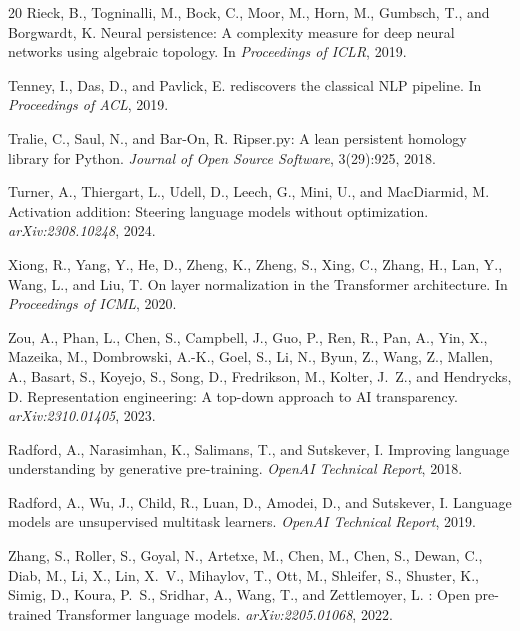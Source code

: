 \documentclass[11pt,a4paper]{article}
\begin{document}
\begin{thebibliography}{20}
Rieck, B., Togninalli, M., Bock, C., Moor, M., Horn, M., Gumbsch, T., and Borgwardt, K.
\newblock Neural persistence: A complexity measure for deep neural networks using algebraic topology.
\newblock In \emph{Proceedings of ICLR}, 2019.

Tenney, I., Das, D., and Pavlick, E.
 rediscovers the classical {NLP} pipeline.
\newblock In \emph{Proceedings of ACL}, 2019.

Tralie, C., Saul, N., and Bar-On, R.
\newblock Ripser.py: A lean persistent homology library for {P}ython.
\newblock \emph{Journal of Open Source Software}, 3(29):925, 2018.

Turner, A., Thiergart, L., Udell, D., Leech, G., Mini, U., and MacDiarmid, M.
\newblock Activation addition: Steering language models without optimization.
\newblock \emph{arXiv:2308.10248}, 2024.

Xiong, R., Yang, Y., He, D., Zheng, K., Zheng, S., Xing, C., Zhang, H., Lan, Y., Wang, L., and Liu, T.
\newblock On layer normalization in the {T}ransformer architecture.
\newblock In \emph{Proceedings of ICML}, 2020.

Zou, A., Phan, L., Chen, S., Campbell, J., Guo, P., Ren, R., Pan, A., Yin, X., Mazeika, M., Dombrowski, A.-K., Goel, S., Li, N., Byun, Z., Wang, Z., Mallen, A., Basart, S., Koyejo, S., Song, D., Fredrikson, M., Kolter, J.~Z., and Hendrycks, D.
\newblock Representation engineering: A top-down approach to {AI} transparency.
\newblock \emph{arXiv:2310.01405}, 2023.


Radford, A., Narasimhan, K., Salimans, T., and Sutskever, I.
\newblock Improving language understanding by generative pre-training.
\newblock \emph{OpenAI Technical Report}, 2018.

Radford, A., Wu, J., Child, R., Luan, D., Amodei, D., and Sutskever, I.
\newblock Language models are unsupervised multitask learners.
\newblock \emph{OpenAI Technical Report}, 2019.

Zhang, S., Roller, S., Goyal, N., Artetxe, M., Chen, M., Chen, S., Dewan, C., Diab, M., Li, X., Lin, X.~V., Mihaylov, T., Ott, M., Shleifer, S., Shuster, K., Simig, D., Koura, P.~S., Sridhar, A., Wang, T., and Zettlemoyer, L.
: Open pre-trained Transformer language models.
\newblock \emph{arXiv:2205.01068}, 2022.


\end{thebibliography}
\end{document}
